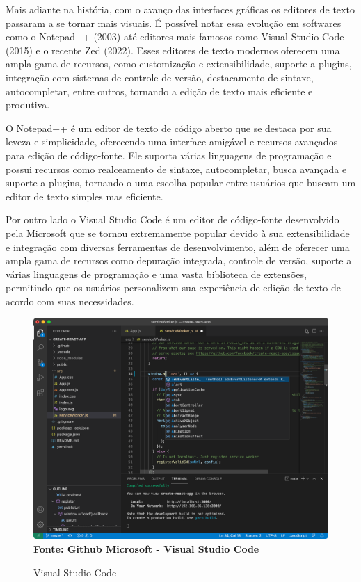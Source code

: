 Mais adiante na história, com o avanço das interfaces gráficas os editores de texto passaram a se tornar mais visuais. É possível notar essa evolução em
softwares como o Notepad++ (2003) até editores mais famosos como Visual Studio Code (2015) e o recente Zed (2022). Esses editores de texto modernos oferecem
uma ampla gama de recursos, como customização e extensibilidade, suporte a plugins, integração com sistemas de controle de versão, destacamento de sintaxe,
autocompletar, entre outros, tornando a edição de texto mais eficiente e produtiva.

O Notepad++ é um editor de texto de código aberto que se destaca por sua leveza e simplicidade, oferecendo uma interface amigável e recursos avançados
para edição de código-fonte. Ele suporta várias linguagens de programação e possui recursos como realceamento de sintaxe, autocompletar, busca avançada e
suporte a plugins, tornando-o uma escolha popular entre usuários que buscam um editor de texto simples mas eficiente.

Por outro lado o Visual Studio Code é um editor de código-fonte desenvolvido pela Microsoft que se tornou extremamente popular devido à sua extensibilidade e
integração com diversas ferramentas de desenvolvimento, além de oferecer uma ampla gama de recursos como depuração integrada, controle de versão, suporte a
várias linguagens de programação e uma vasta biblioteca de extensões, permitindo que os usuários personalizem sua experiência de edição de texto de acordo com
suas necessidades.

\FloatBarrier

\begin{figure}[!htbp]
	\centering
	\caption{Visual Studio Code}
	\includegraphics[scale=0.3]{imagens/VSCode}
	\\\textbf{Fonte: Github Microsoft - Visual Studio Code}
	\label{fig:VSCode}
\end{figure}
\FloatBarrier

